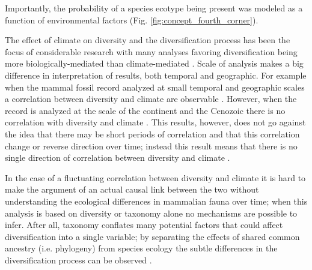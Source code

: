 \documentclass[12pt,letterpaper]{article}
\begin{document}
Importantly, the probability of a species ecotype being present was modeled as a function of environmental factors (Fig. \ref{fig:concept_fourth_corner}). 

The effect of climate on diversity and the diversification process has been the focus of considerable research with many analyses favoring diversification being more biologically-mediated than climate-mediated \citep{Alroy1996a,Alroy2000g,Figueirido2012,Clyde1998a}. Scale of analysis makes a big difference in interpretation of results, both temporal and geographic. For example when the mammal fossil record analyzed at small temporal and geographic scales a correlation between diversity and climate are observable \citep{Clyde1998a}. However, when the record is analyzed at the scale of the continent and the Cenozoic there is no correlation with diversity and climate \citep{Alroy2000g}. This results, however, does not go against the idea that there may be short periods of correlation and that this correlation change or reverse direction over time; instead this result means that there is no single direction of correlation between diversity and climate \citep{Figueirido2012}. 

In the case of a fluctuating correlation between diversity and climate it is hard to make the argument of an actual causal link between the two without understanding the ecological differences in mammalian fauna over time; when this analysis is based on diversity or taxonomy alone no mechanisms are possible to infer. After all, taxonomy conflates many potential factors that could affect diversification into a single variable; by separating the effects of shared common ancestry (i.e. phylogeny) from species ecology the subtle differences in the diversification process can be observed \citep{Smits2015b}.
\end{document}
